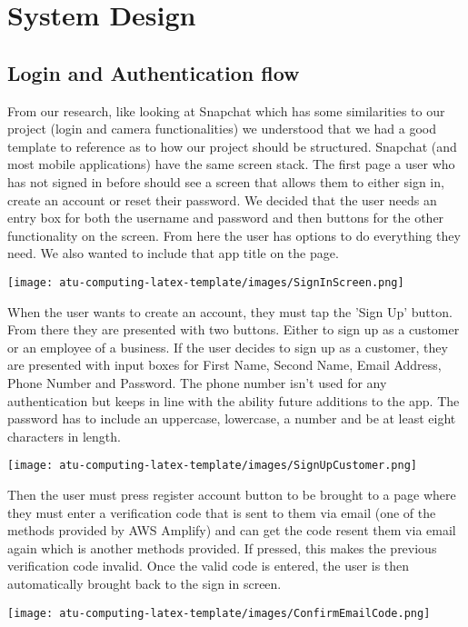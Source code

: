 \chapter{System Design}
\section{Login and Authentication flow}
From our research, like looking at Snapchat which has some similarities to our project (login and camera functionalities) we understood that we had a good template to reference as to how our project should be structured. Snapchat (and most mobile applications) have the same screen stack. The first page a user who has not signed in before should see a screen that allows them to either sign in, create an account or reset their password. We decided that the user needs an entry box for both the username and password and then buttons for the other functionality on the screen. From here the user has options to do everything they need. We also wanted to include that app title on the page. 
\begin{center}
\texttt{[image: atu-computing-latex-template/images/SignInScreen.png]}
\end{center}
When the user wants to create an account, they must tap the 'Sign Up' button. From there they are presented with two buttons. Either to sign up as a customer or an employee of a business. If the user decides to sign up as a customer, they are presented with input boxes for First Name, Second Name, Email Address, Phone Number and Password. The phone number isn't used for any authentication but keeps in line with the ability future additions to the app. The password has to include an uppercase, lowercase, a number and be at least eight characters in length.
\begin{center}
\texttt{[image: atu-computing-latex-template/images/SignUpCustomer.png]}
\end{center}
Then the user must press register account button to be brought to a page where they must enter a verification code that is sent to them via email (one of the methods provided by AWS Amplify) and can get the code resent them via email again which is another methods provided. If pressed, this makes the previous verification code invalid. Once the valid code is entered, the user is then automatically brought back to the sign in screen. 
\begin{center}
\texttt{[image: atu-computing-latex-template/images/ConfirmEmailCode.png]}
\end{center}
